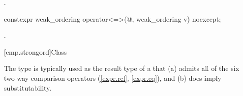\begin{itemdescr}
\pnum
\returns
{}.
\end{itemdescr}

%
\begin{itemdecl}
constexpr weak_ordering operator<=>(@\unspec@, weak_ordering v) noexcept;
\end{itemdecl}

\begin{itemdescr}
\pnum
\returns
{}.
\end{itemdescr}

[cmp.strongord]{Class }

\pnum
The  type is typically used
as the result type of a 
that (a) admits all of the six two-way comparison operators (\ref{expr.rel}, \ref{expr.eq}),
and (b) does imply substitutability.

